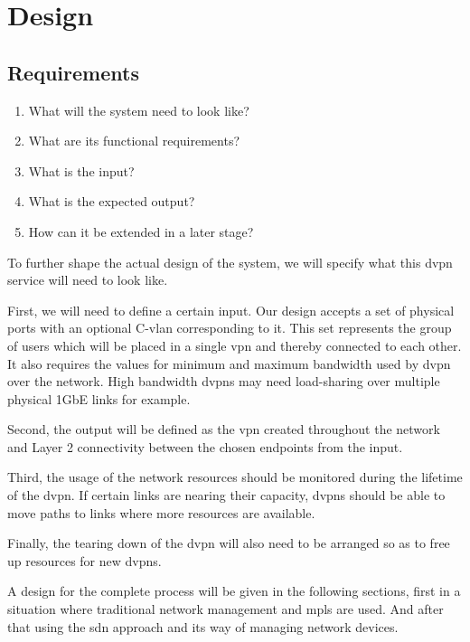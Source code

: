 \section{Design} %
\label{sec:design}

\subsection{Requirements} %
\label{sub:requirements}
\begin{enumerate}
	\item What will the system need to look like?
	\item What are its functional requirements?
	\item What is the input?
	\item What is the expected output?
	\item How can it be extended in a later stage?
\end{enumerate}

To further shape the actual design of the system, we will specify what this \ac{dvpn} service will need to look like. 

First, we will need to define a certain input. Our design accepts a set of physical ports with an optional C-\ac{vlan} corresponding to it. This set represents the group of users which will be placed in a single \ac{vpn} and thereby connected to each other. It also requires the values for minimum and maximum bandwidth used by \ac{dvpn} over the network. High bandwidth \acp{dvpn} may need load-sharing over multiple physical 1GbE links for example.

Second, the output will be defined as the \ac{vpn} created throughout the network and Layer 2 connectivity between the chosen endpoints from the input.

Third, the usage of the network resources should be monitored during the lifetime of the \ac{dvpn}. If certain links are nearing their capacity, \acp{dvpn} should be able to move paths to links where more resources are available.

Finally, the tearing down of the \ac{dvpn} will also need to be arranged so as to free up resources for new \acp{dvpn}.

A design for the complete process will be given in the following sections, first in a situation where traditional network management and \ac{mpls} are used. And after that using the \ac{sdn} approach and its way of managing network devices.

